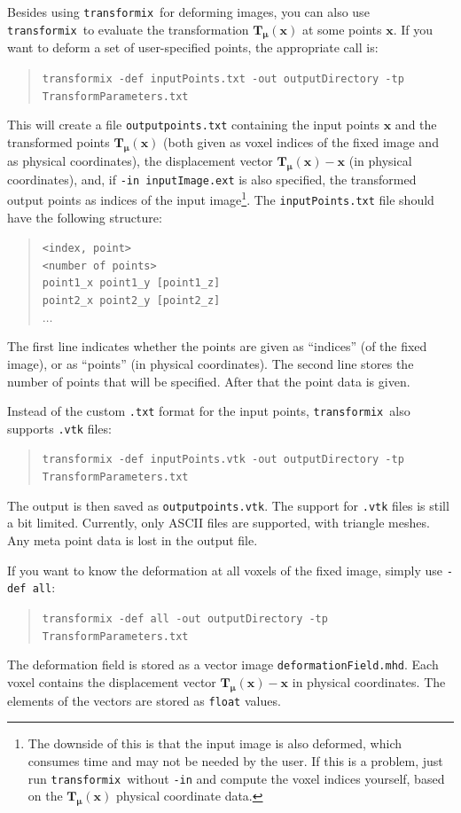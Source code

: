 \documentclass[]{report}
\newcommand{\transformix}{\texttt{transformix}}
\newcommand{\vx}{\bm{x}}
\newcommand{\vmu}{\bm{\mu}}
\newcommand{\vTmx}{\bm{T}_{\vmu}(\bm{x})}
\begin{document}
Besides using \transformix\ for deforming images, you can also use
\transformix\ to evaluate the transformation $\vTmx$ at some
points $\vx$. If you want to deform a set of user-specified
points, the appropriate call is:
\begin{quote}
\texttt{transformix -def inputPoints.txt -out outputDirectory -tp
TransformParameters.txt}
\end{quote}
This will create a file \texttt{outputpoints.txt} containing the
input points $\vx$ and the transformed points $\vTmx$ (both given
as voxel indices of the fixed image and as physical coordinates),
the displacement vector $\vTmx-\vx$ (in physical coordinates),
and, if \texttt{-in inputImage.ext} is also specified, the
transformed output points as indices of the input
image\footnote{The downside of this is that the input image is
also deformed, which consumes time and may not be needed by the
user. If this is a problem, just run \transformix\ without
\texttt{-in} and compute the voxel indices yourself, based on the
$\vTmx$ physical coordinate data.}. The \texttt{inputPoints.txt}
file should have the following structure:
\begin{quote}
\texttt{<index, point>}\\
\texttt{<number of points>}\\
\texttt{point1\_x point1\_y [point1\_z]}\\
\texttt{point2\_x point2\_y [point2\_z]}\\
\texttt{$\ldots$}
\end{quote}
The first line indicates whether the points are given as
``indices'' (of the fixed image), or as ``points'' (in physical
coordinates). The second line stores the number of points that
will be specified. After that the point data is given.

Instead of the custom \texttt{.txt} format for the input points, \transformix\
also supports \texttt{.vtk} files:
\begin{quote}
\texttt{transformix -def inputPoints.vtk -out outputDirectory -tp
TransformParameters.txt}
\end{quote}
The output is then saved as \texttt{outputpoints.vtk}. The support for
\texttt{.vtk} files is still a bit limited. Currently, only ASCII files are
supported, with triangle meshes. Any meta point data is lost in the output
file.

If you want to know the deformation at all voxels of the fixed
image, simply use \texttt{-def all}:
\begin{quote}
\texttt{transformix -def all -out outputDirectory -tp
TransformParameters.txt}
\end{quote}
The deformation field is stored as a vector image
\texttt{deformationField.mhd}. Each voxel contains the
displacement vector $\vTmx-\vx$ in physical coordinates. The
elements of the vectors are stored as \texttt{float} values.
\end{document}
